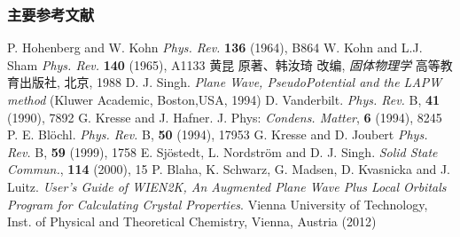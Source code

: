 \documentclass[cjk,slidestop,compress,mathserif,blue]{beamer}
\begin{document}
\begin{thebibliography}{99}
\frame
{
\frametitle{主要参考文献}
{\small
{}\textrm{P. Hohenberg and W. Kohn \textit{Phys. Rev.} \textbf{136} (1964), B864}
\textrm{W. Kohn and L.J. Sham \textit{Phys. Rev.} \textbf{140} (1965), A1133}
\textrm{黄昆 原著、韩汝琦 改编, \textit{固体物理学} 高等教育出版社, 北京, 1988}
\textrm{D. J. Singh. \textit{Plane Wave, PseudoPotential and the LAPW method} (Kluwer Academic, Boston,USA, 1994)}
\textrm{D. Vanderbilt. \textit{Phys. Rev.} B, \textbf{41} (1990), 7892} 
\textrm{G. Kresse and J. Hafner. J. Phys: \textit{Condens. Matter}, \textbf{6} (1994), 8245}
\textrm{P. E. Bl\"ochl. \textit{Phys. Rev.} B, \textbf{50} (1994), 17953}
\textrm{G. Kresse and D. Joubert \textit{Phys. Rev.} B, \textbf{59} (1999), 1758}
\textrm{E. Sj\"ostedt, L. Nordstr\"om and D. J. Singh. \textit{Solid State Commun.}, \textbf{114} (2000), 15}
\textrm{P. Blaha, K. Schwarz, G. Madsen, D. Kvasnicka and J. Luitz. \textit{User's Guide of WIEN2K, An Augmented Plane Wave Plus Local Orbitals Program for Calculating Crystal Properties}. Vienna University of Technology, Inst. of Physical and Theoretical Chemistry, Vienna, Austria (2012)}
\nocite*{}
}
}


\end{thebibliography}
\end{document}
